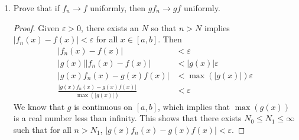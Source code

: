 \documentclass{article}
\begin{document}
\begin{enumerate}
\begin{enumerate}
\begin{proof}
                              This shows that there exists $N_0\leq N_1\leq \infty$ such that for
                              all $n>N_1$, $\lvert g(x)f_n(x)-g(x)f(x)\rvert<\varepsilon$.
                        \end{proof}
                  \item Prove that if $f_n\to f$ uniformly,
                        then $gf_n\to gf$ uniformly.
                        \begin{proof}
                              Given $\varepsilon>0$, there exists an $N$ so that
                              $n>N$ implies $\lvert f_n(x)-f(x)\rvert < \varepsilon$
                              for all $x\in [a,b]$. Then
                              \begin{align*}
                                    \lvert f_n(x)-f(x)\rvert                                         & < \varepsilon                        \\
                                    \lvert g(x)\rvert\lvert f_n(x)-f(x)\rvert                        & < \lvert g(x)\rvert\varepsilon       \\
                                    \lvert g(x)f_n(x)-g(x)f(x)\rvert                                 & < \max(\lvert g(x)\rvert)\varepsilon \\
                                    \frac{\lvert g(x)f_n(x)-g(x)f(x)\rvert}{\max(\lvert g(x)\rvert)} & < \varepsilon
                              \end{align*}
                              We know that $g$ is continuous on $[a,b]$, which implies that
                              $\max(g(x))$ is a real number less than infinity.
                              This shows that there exists $N_0\leq N_1\leq \infty$ such that for
                              all $n>N_1$, $\lvert g(x)f_n(x)-g(x)f(x)\rvert<\varepsilon$.


\end{proof}
\end{enumerate}
\end{enumerate}
\end{document}
